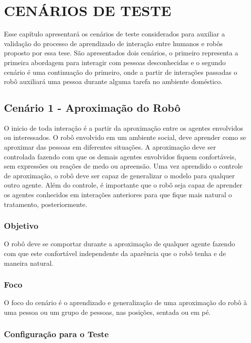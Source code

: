 \chapter{CENÁRIOS DE TESTE}
\label{cap:testes}
Esse capítulo apresentará os cenários de teste considerados para auxiliar a validação do processo de aprendizado de interação entre humanos e robôs proposto por essa tese. São apresentados dois cenários, o primeiro representa a primeira abordagem para interagir com pessoas desconhecidas e o segundo cenário é uma continuação do primeiro, onde a partir de interações passadas o robô auxiliará uma pessoa durante alguma tarefa no ambiente doméstico.

\section{Cenário 1 - Aproximação do Robô}
\label{sec:cenario1}
O inicio de toda interação é a partir da aproximação entre os agentes envolvidos ou interessados. O robô envolvido em um ambiente social, deve aprender como se aproximar das pessoas em diferentes situações. A aproximação deve ser controlada fazendo com que os demais agentes envolvidos fiquem confortáveis, sem expressões ou reações de medo ou apreensão. Uma vez aprendido o controle de aproximação, o robô deve ser capaz de generalizar o modelo para qualquer outro agente. Além do controle, é importante que o robô seja capaz de aprender os agentes conhecidos em interações anteriores para que fique mais natural o tratamento, posteriormente.

\subsection{Objetivo}

O robô deve se comportar durante a aproximação de qualquer agente fazendo com que este confortável independente da aparência que o robô tenha e de maneira natural.

\subsection{Foco}

O foco do cenário é o aprendizado e generalização de uma aproximação do robô à uma pessoa ou um grupo de pessoas, nas posições, sentada ou em pé.

\subsection{Configuração para o Teste}

